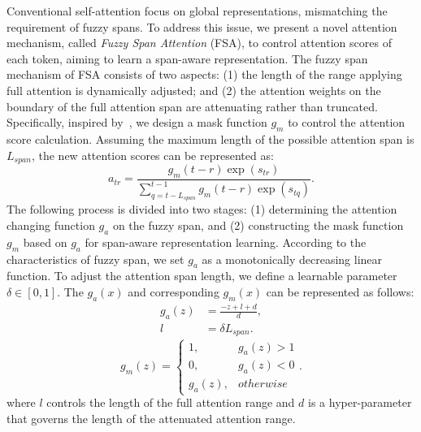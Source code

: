 \documentclass[11pt]{article}
\begin{document}
Conventional self-attention focus on global representations, mismatching the requirement of fuzzy spans. To address this issue, we present a novel attention mechanism, called \textit{Fuzzy Span Attention} (FSA), to control attention scores of each token, aiming to learn a span-aware representation. The fuzzy span mechanism of FSA consists of two aspects: (1) the length of the range applying full attention is dynamically adjusted; and (2) the attention weights on the boundary of the full attention span are attenuating rather than truncated. Specifically, inspired by~\cite{sukhbaatar-etal-2019-adaptive}, we design a mask function $g_{m}$ to control the attention score calculation. Assuming the maximum length of the possible attention span is $L_{span}$, the new attention scores can be represented as:
\begin{equation}
    a_{t r}=\frac{g_{m}(t-r)\exp \left(s_{t r}\right)}{\sum_{q=t-L_{span}}^{t-1} g_{m}(t-r)\exp \left(s_{t q}\right)}.
\end{equation}
The following process is divided into two stages: (1) determining the attention changing function $g_{a}$ on the fuzzy span, and (2) constructing the mask function $g_{m}$ based on $g_{a}$ for span-aware representation learning.
According to the characteristics of fuzzy span, we set $g_{a}$ as a monotonically decreasing linear function. To adjust the attention span length, we define a learnable parameter $\delta \in [0,1]$. The $g_{a}(x)$ and corresponding $g_{m}(x)$ can be represented as follows:
\begin{equation}
\begin{aligned}
    g_{a}(z)&=\frac{-z+l+d}{d}, \\
    l&=\delta L_{span}.
\end{aligned}
\end{equation}
\begin{equation}
g_{m}(z)=\left\{\begin{array}{ll}
1, & g_{a}(z)>1 \\
0, & g_{a}(z)<0 \\
g_{a}(z), &  otherwise 
\end{array}\right..
\end{equation}
where $l$ controls the length of the full attention range and $d$ is a hyper-parameter that governs the length of the attenuated attention range.
\end{document}
